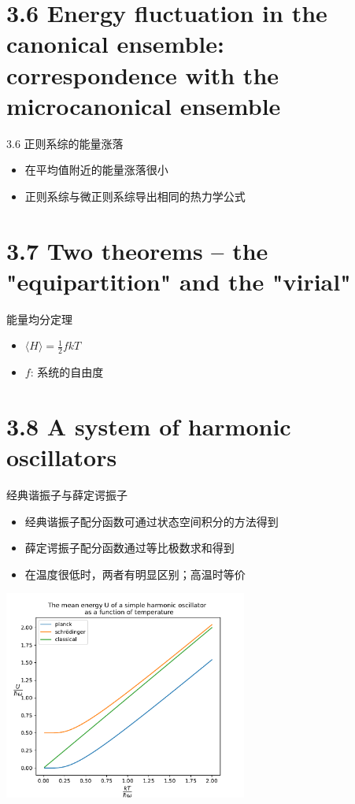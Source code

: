 \documentclass{ctexbeamer}
\begin{document}
\section{3.6 Energy fluctuation in the canonical ensemble: correspondence with the microcanonical ensemble}
\begin{frame}{3.6 正则系综的能量涨落}
    \begin{itemize}
        \item 在平均值附近的能量涨落很小
        \item 正则系综与微正则系综导出相同的热力学公式
    \end{itemize}
\end{frame}
\section{3.7 Two theorems -- the "equipartition" and the "virial"}
\begin{frame}{能量均分定理}
\begin{itemize}
    \item $\langle H \rangle = \frac{1}{2} fkT$
    \item $f$: 系统的自由度
\end{itemize}
\end{frame}
\section{3.8 A system of harmonic oscillators}
\begin{frame}{经典谐振子与薛定谔振子}
    \begin{itemize}
        \item 经典谐振子配分函数可通过状态空间积分的方法得到
        \item 薛定谔振子配分函数通过等比极数求和得到
        \item 在温度很低时，两者有明显区别；高温时等价
    \end{itemize}
    \begin{center}
    \includegraphics[width=0.6\textwidth]{oscillator_energy.pdf}
    \end{center}
\end{frame}
\end{document}
